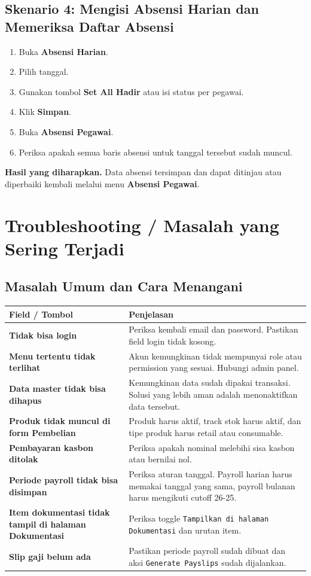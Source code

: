 \documentclass[12pt,a4paper]{article}
\newcommand{\FieldTableStart}{
\begin{longtable}{L{0.30\textwidth}L{0.64\textwidth}}
\toprule
\textbf{Field / Tombol} & \textbf{Penjelasan} \\
\midrule
\endhead
}
\newcommand{\FieldTableEnd}{
\bottomrule
\end{longtable}
}
\newcommand{\FieldRow}[2]{
\textbf{#1} & #2 \\
}
\begin{document}
\subsection{Skenario 4: Mengisi Absensi Harian dan Memeriksa Daftar Absensi}
\begin{enumerate}
    \item Buka \textbf{Absensi Harian}.
    \item Pilih tanggal.
    \item Gunakan tombol \textbf{Set All Hadir} atau isi status per pegawai.
    \item Klik \textbf{Simpan}.
    \item Buka \textbf{Absensi Pegawai}.
    \item Periksa apakah semua baris absensi untuk tanggal tersebut sudah muncul.
\end{enumerate}

\textbf{Hasil yang diharapkan.} Data absensi tersimpan dan dapat ditinjau atau diperbaiki kembali melalui menu \textbf{Absensi Pegawai}.

\section{Troubleshooting / Masalah yang Sering Terjadi}
\subsection{Masalah Umum dan Cara Menangani}
\FieldTableStart
\FieldRow{Tidak bisa login}{Periksa kembali email dan password. Pastikan field login tidak kosong.}
\FieldRow{Menu tertentu tidak terlihat}{Akun kemungkinan tidak mempunyai role atau permission yang sesuai. Hubungi admin panel.}
\FieldRow{Data master tidak bisa dihapus}{Kemungkinan data sudah dipakai transaksi. Solusi yang lebih aman adalah menonaktifkan data tersebut.}
\FieldRow{Produk tidak muncul di form Pembelian}{Produk harus aktif, track stok harus aktif, dan tipe produk harus retail atau consumable.}
\FieldRow{Pembayaran kasbon ditolak}{Periksa apakah nominal melebihi sisa kasbon atau bernilai nol.}
\FieldRow{Periode payroll tidak bisa disimpan}{Periksa aturan tanggal. Payroll harian harus memakai tanggal yang sama, payroll bulanan harus mengikuti cutoff 26-25.}
\FieldRow{Item dokumentasi tidak tampil di halaman Dokumentasi}{Periksa toggle \texttt{Tampilkan di halaman Dokumentasi} dan urutan item.}
\FieldRow{Slip gaji belum ada}{Pastikan periode payroll sudah dibuat dan aksi \texttt{Generate Payslips} sudah dijalankan.}
\FieldTableEnd
\end{document}
